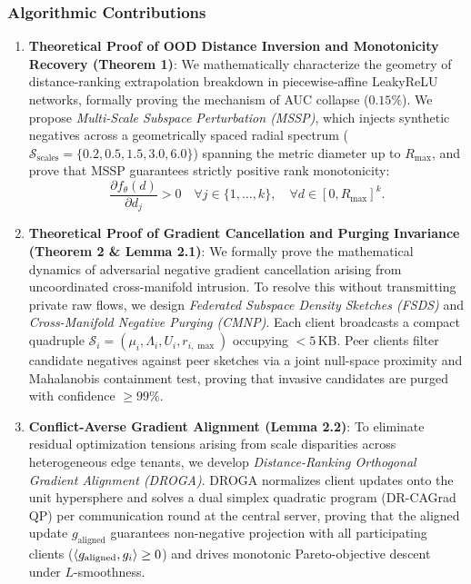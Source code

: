 \subsubsection{Algorithmic Contributions}
\begin{enumerate}
    \item \textbf{Theoretical Proof of OOD Distance Inversion and Monotonicity Recovery (Theorem 1)}: We mathematically characterize the geometry of distance-ranking extrapolation breakdown in piecewise-affine LeakyReLU networks, formally proving the mechanism of AUC collapse ($0.15\%$). We propose \emph{Multi-Scale Subspace Perturbation (MSSP)}, which injects synthetic negatives across a geometrically spaced radial spectrum ($\mathcal{S}_{\text{scales}} = \{0.2, 0.5, 1.5, 3.0, 6.0\}$) spanning the metric diameter up to $R_{\max}$, and prove that MSSP guarantees strictly positive rank monotonicity:
    \begin{equation}
    \frac{\partial f_\theta(d)}{\partial d_j} > 0 \quad \forall j \in \{1, \dots, k\}, \quad \forall d \in [0, R_{\max}]^k.
    \end{equation}
    \item \textbf{Theoretical Proof of Gradient Cancellation and Purging Invariance (Theorem 2 \& Lemma 2.1)}: We formally prove the mathematical dynamics of adversarial negative gradient cancellation arising from uncoordinated cross-manifold intrusion. To resolve this without transmitting private raw flows, we design \emph{Federated Subspace Density Sketches (FSDS)} and \emph{Cross-Manifold Negative Purging (CMNP)}. Each client broadcasts a compact quadruple $\mathcal{S}_i = (\mu_i, \Lambda_i, U_i, r_{i,\max})$ occupying $<5$\,KB. Peer clients filter candidate negatives against peer sketches via a joint null-space proximity and Mahalanobis containment test, proving that invasive candidates are purged with confidence $\ge 99\%$.
    \item \textbf{Conflict-Averse Gradient Alignment (Lemma 2.2)}: To eliminate residual optimization tensions arising from scale disparities across heterogeneous edge tenants, we develop \emph{Distance-Ranking Orthogonal Gradient Alignment (DROGA)}. DROGA normalizes client updates onto the unit hypersphere and solves a dual simplex quadratic program (DR-CAGrad QP) per communication round at the central server, proving that the aligned update $g_{\text{aligned}}$ guarantees non-negative projection with all participating clients ($\left\langle g_{\text{aligned}},g_i\right\rangle \ge 0$) and drives monotonic Pareto-objective descent under $L$-smoothness.
\end{enumerate}

